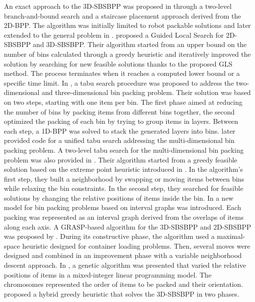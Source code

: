 An exact approach to the 3D-SBSBPP was proposed in \cite{martello2000three} through a two-level branch-and-bound search and a staircase placement approach derived from the 2D-BPP.
The algorithm was initially limited to robot packable solutions and later extended to the general problem in \cite{martello2007exact}.
\cite{faroe2003guided} proposed a Guided Local Search for 2D-SBSBPP and 3D-SBSBPP.
Their algorithm started from an upper bound on the number of bins calculated through a greedy heuristic and iteratively improved the solution by searching for new feasible solutions thanks to the proposed GLS method.
The process terminates when it reaches a computed lower bound or a specific time limit.
In \cite{lodi2002heuristic}, a tabu search procedure was proposed to address the two-dimensional and three-dimensional bin packing problem.
Their solution was based on two steps, starting with one item per bin.
The first phase aimed at reducing the number of bins by packing items from different bins together, the second optimized the packing of each bin by trying to group items in layers.
Between each step, a 1D-BPP was solved to stack the generated layers into bins.
\cite{Lodi2004} later provided code for a unified tabu search addressing the multi-dimensional bin packing problem.
A two-level tabu search for the multi-dimensional bin packing problem was also provided in \cite{crainic2009ts2pack}.
Their algorithm started from a greedy feasible solution based on the extreme point heuristic introduced in \cite{crainic2008extreme}.
In the algorithm's first step, they built a neighborhood by swapping or moving items between bins while relaxing the bin constraints.
In the second step, they searched for feasible solutions by changing the relative positions of items inside the bin.
In \cite{fekete2004combinatorial} a new model for bin packing problems based on interval graphs was introduced.
Each packing was represented as an interval graph derived from the overlaps of items along each axis.
A GRASP-based algorithm for the 3D-SBSBPP and 2D-SBSBPP was proposed by \cite{parreno2010hybrid}. During its constructive phase, the algorithm used a maximal-space heuristic designed for container loading problems.
Then, several moves were designed and combined in an improvement phase with a variable neighborhood descent approach.
In \cite{WU2010347}, a genetic algorithm was presented that varied the relative positions of items in a mixed-integer linear programming model. The chromosomes represented the order of items to be packed and their orientation.
\cite{hifi2014hybrid} proposed a hybrid greedy heuristic that solves the 3D-SBSBPP in two phases.
